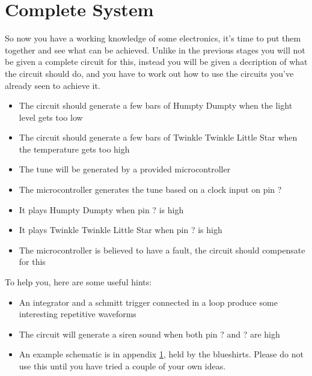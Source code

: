 \section{Complete System}
So now you have a working knowledge of some electronics, it's time to put them together and see what can be achieved.
Unlike in the previous stages you will not be given a complete circuit for this, instead you will be given a decription of what the circuit should do, and you have to work out how to use the circuits you've already seen to achieve it.

\begin{itemize}
\item The circuit should generate a few bars of Humpty Dumpty when the light level gets too low
\item The circuit should generate a few bars of Twinkle Twinkle Little Star when the temperature gets too high
\item The tune will be generated by a provided microcontroller
\item The microcontroller generates the tune based on a clock input on pin ?
\item It plays Humpty Dumpty when pin ? is high
\item It plays Twinkle Twinkle Little Star when pin ? is high
\item The microcontroller is believed to have a fault, the circuit should compensate for this
\end{itemize}

To help you, here are some useful hints:

\begin{itemize}
\item An integrator and a schmitt trigger connected in a loop produce some interesting repetitive waveforms
\item The circuit will generate a siren sound when both pin ? and ? are high
\item An example schematic is in appendix \ref{}, held by the blueshirts. Please do not use this until you have tried a couple of your own ideas.
\end{itemize}
